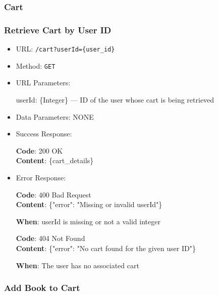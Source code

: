 \subsubsection*{Cart}

\subsubsection*{Retrieve Cart by User ID}

\begin{itemize}
    \item URL: \texttt{/cart?userId=\{user\_id\}}
    \item Method: \texttt{GET}
    \item URL Parameters:

    userId: \{Integer\} — ID of the user whose cart is being retrieved

    \item Data Parameters: NONE

    \item Success Response: \newline

    \textbf{Code}: 200 OK \\
    \textbf{Content}: \{cart\_details\}

    \item Error Response: \newline

    \textbf{Code}: 400 Bad Request \\
    \textbf{Content}: \{"error": "Missing or invalid userId"\}

    \textbf{When}: userId is missing or not a valid integer \newline

    \textbf{Code}: 404 Not Found \\
    \textbf{Content}: \{"error": "No cart found for the given user ID"\}

    \textbf{When}: The user has no associated cart
\end{itemize}

\subsubsection*{Add Book to Cart}

